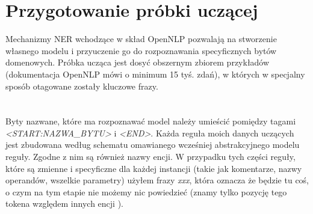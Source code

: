 \section{Przygotowanie próbki uczącej}
Mechanizmy NER wchodzące w skład OpenNLP pozwalają na stworzenie własnego modelu i przyuczenie go do rozpoznawania specyficznych bytów domenowych. Próbka ucząca jest dosyć obszernym zbiorem przykładów (dokumentacja OpenNLP mówi o minimum 15 tyś. zdań), w których w specjalny sposób otagowane zostały kluczowe frazy. 
\\ \\

\paragraph{}
Byty nazwane, które ma rozpoznawać model należy umieścić pomiędzy tagami \\ \textit{<START:NAZWA\_BYTU>} i \textit{<END>}. Każda reguła moich danych uczących jest zbudowana według schematu omawianego wcześniej abstrakcyjnego modelu reguły. Zgodne z nim są również nazwy encji.
W przypadku tych części reguły, które są zmienne i specyficzne dla każdej instancji (takie jak komentarze, nazwy operandów, wszelkie parametry) użyłem frazy \textit{xxx}, która oznacza że będzie tu coś, o czym na tym etapie nie możemy nic powiedzieć (znamy tylko pozycję tego tokena względem innych encji ). 
